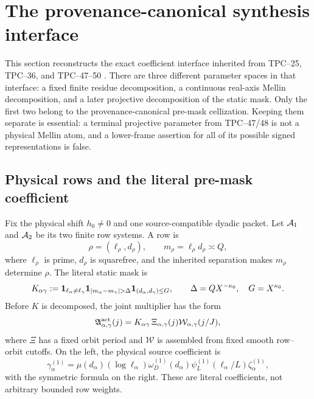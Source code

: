 \section{The provenance-canonical synthesis interface}
\label{sec:tpc51-inherited-interface}

This section reconstructs the exact coefficient interface inherited from
TPC--25, TPC--36, and TPC--47--50
\citep{WangTPC25,WangTPC36,WangTPC47,WangTPC48,WangTPC49,WangTPC50}.
There are three different parameter spaces in that interface: a fixed finite
residue decomposition, a continuous real-axis Mellin decomposition, and a
later projective decomposition of the static mask.  Only the first two belong
to the provenance-canonical pre-mask cellization.  Keeping them separate is
essential: a terminal projective parameter from TPC--47/48 is not a physical
Mellin atom, and a lower-frame assertion for all of its possible signed
representations is false.

\subsection{Physical rows and the literal pre-mask coefficient}

Fix the physical shift $h_0\ne0$ and one source-compatible dyadic packet.
Let $\mathcal A_1$ and $\mathcal A_2$ be its two finite row systems.  A row is
\begin{equation}
 \rho=(\ell_\rho,d_\rho),
 \qquad
 m_\rho=\ell_\rho d_\rho\asymp Q,
 \label{eq:tpc51-row}
\end{equation}
where $\ell_\rho$ is prime, $d_\rho$ is squarefree, and the inherited
separation makes $m_\rho$ determine $\rho$.  The literal static mask is
\begin{equation}
 K_{\alpha\gamma}
 :=\one_{\ell_\alpha\ne\ell_\gamma}
   \one_{|m_\alpha-m_\gamma|>\Delta}
   \one_{(d_\alpha,d_\gamma)\le G},
 \qquad
 \Delta=QX^{-\kappa_0},\quad G=X^{\kappa_0}.
 \label{eq:tpc51-literal-mask}
\end{equation}
Before $K$ is decomposed, the joint multiplier has the form
\begin{equation}
 \mathfrak A_{\alpha,\gamma}^{\rm act}(j)
 =K_{\alpha\gamma}\,
  \Xi_{\alpha,\gamma}(j)
  \mathcal W_{\alpha,\gamma}(j/J),
 \label{eq:tpc51-joint-multiplier}
\end{equation}
where $\Xi$ has a fixed orbit period and $\mathcal W$ is assembled from
fixed smooth row--orbit cutoffs.  On the left, the physical source
coefficient is
\begin{equation}
 \gamma_\alpha^{(1)}
 =\mu(d_\alpha)(\log\ell_\alpha)
  \omega_D^{(1)}(d_\alpha)
  \psi_L^{(1)}(\ell_\alpha/L)\zeta_\alpha^{(1)},
 \label{eq:tpc51-source-coefficient}
\end{equation}
with the symmetric formula on the right.  These are literal coefficients,
not arbitrary bounded row weights.

